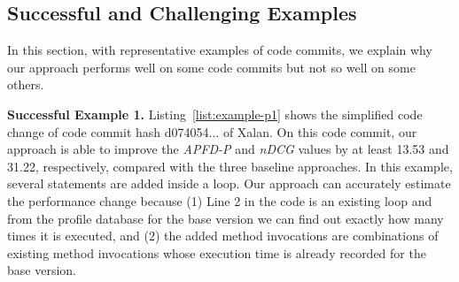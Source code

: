 





\subsection{Successful and Challenging Examples}
\label{sec:qualitative}

In this section, with representative examples of code commits, we explain why our approach performs well on some code commits but not so well on some others. 


\textbf{Successful Example 1.} Listing~\ref{list:example-p1} shows the simplified code change of code commit hash d074054... of Xalan. On this code commit, our approach is able to improve the \textit{APFD-P} and \textit{nDCG} values by at least 13.53 and 31.22, respectively, compared with the three baseline approaches. In this example, several statements are added inside a loop. Our approach can accurately estimate the performance change because (1) Line 2 in the code is an existing loop and from the profile database for the base version we can find out exactly how many times it is executed, and (2) the added method invocations are combinations of existing method invocations whose execution time is already recorded for the base version. \\

